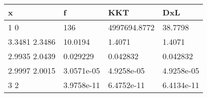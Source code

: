 \begin{tabular}{llll}
x & f & KKT & DxL \\ 
\hline 
1  0 & 136 & 4997694.8772 & 38.7798 \\ 
3.3481      2.3486 & 10.0194 & 1.4071 & 1.4071 \\ 
2.9935      2.0439 & 0.029229 & 0.042832 & 0.042832 \\ 
2.9997      2.0015 & 3.0571e-05 & 4.9258e-05 & 4.9258e-05 \\ 
3           2 & 3.9758e-11 & 6.4752e-11 & 6.4134e-11 \\ 
\hline 
\end{tabular}